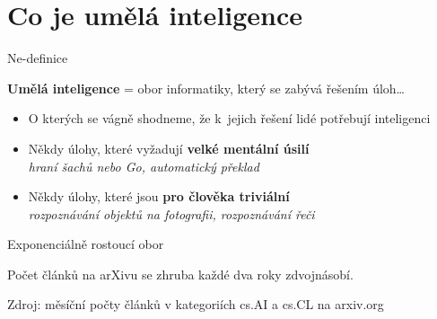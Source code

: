 \section[Co je AI]{Co je umělá inteligence}


\begin{frame}{Ne-definice}

    \begin{center}
        \Large
    \textbf{Umělá inteligence} = obor informatiky, který se zabývá řešením
    úloh\ldots
    \end{center}

    \vspace{10pt}

    \begin{itemize}

        \item<2-> O kterých se vágně shodneme, že k~jejich řešení lidé potřebují
            inteligenci

        \item<3-> Někdy úlohy, které vyžadují \textbf{velké mentální úsilí} \\
            \quad \emph{hraní šachů nebo Go, automatický překlad}

        \item<4-> Někdy úlohy, které jsou \textbf{pro člověka triviální} \\
            \quad \emph{rozpoznávání objektů na fotografii, rozpoznávání řeči}

    \end{itemize}

    \centering\vspace{15pt}


\end{frame}


\begin{frame}{Exponenciálně rostoucí obor}

    \centering
    

    Počet článků na arXivu se zhruba každé dva roky zdvojnásobí.

    {\footnotesize Zdroj: měsíční počty článků v kategoriích cs.AI a cs.CL na arxiv.org}

\end{frame}

